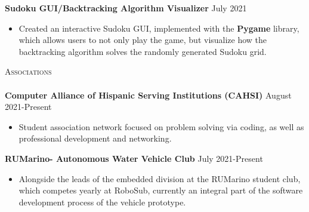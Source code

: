 \documentclass[a4paper]{article}
\newcommand{\lineunder} {
    \vspace*{-8pt} \\
    \hspace*{-18pt} \hrulefill \\
}
\newcommand{\header} [1] {
    {\hspace*{-18pt}\vspace*{6pt} \textsc{#1}}
    \vspace*{-6pt} \lineunder
}
\begin{document}
{\textbf{Sudoku GUI/Backtracking Algorithm Visualizer}} \hfill July 2021  \\
\vspace{-1.5mm}

\begin{itemize} \itemsep -1pt
\item Created an interactive Sudoku GUI, implemented with the \textbf{Pygame} library, which allows users to not only play the game, but visualize how the backtracking algorithm solves the randomly generated Sudoku grid.
\end{itemize}

\header{Associations}

\vspace{-1mm} \textbf{Computer Alliance of Hispanic Serving Institutions (CAHSI)} \hfill August 2021-Present\\
\begin{itemize} \itemsep -1pt
\vspace{-2mm}
\item Student association network focused on problem solving via coding, as well as professional development and networking. \\
\end{itemize}

\vspace{-2mm}
\textbf{RUMarino- Autonomous Water Vehicle Club} \hfill July 2021-Present \\ 
\vspace{-2mm}
\begin{itemize} \itemsep -1pt
\item Alongside the leads of the embedded division at the RUMarino student club, which competes yearly at RoboSub, currently an integral part of the software development process of the vehicle prototype. \\ 
\end{itemize}
 


\ 
\end{document}

